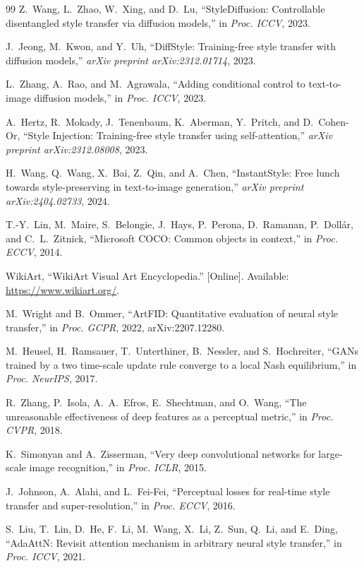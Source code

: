 \documentclass[10pt,twocolumn]{article}
\begin{document}
\begin{thebibliography}{99}
 Z.~Wang, L.~Zhao, W.~Xing, and D.~Lu, ``StyleDiffusion: Controllable disentangled style transfer via diffusion models,'' in \emph{Proc. ICCV}, 2023.

 J.~Jeong, M.~Kwon, and Y.~Uh, ``DiffStyle: Training-free style transfer with diffusion models,'' \emph{arXiv preprint arXiv:2312.01714}, 2023.

 L.~Zhang, A.~Rao, and M.~Agrawala, ``Adding conditional control to text-to-image diffusion models,'' in \emph{Proc. ICCV}, 2023.

 A.~Hertz, R.~Mokady, J.~Tenenbaum, K.~Aberman, Y.~Pritch, and D.~Cohen-Or, ``Style Injection: Training-free style transfer using self-attention,'' \emph{arXiv preprint arXiv:2312.08008}, 2023.

 H.~Wang, Q.~Wang, X.~Bai, Z.~Qin, and A.~Chen, ``InstantStyle: Free lunch towards style-preserving in text-to-image generation,'' \emph{arXiv preprint arXiv:2404.02733}, 2024.

 T.-Y.~Lin, M.~Maire, S.~Belongie, J.~Hays, P.~Perona, D.~Ramanan, P.~Doll\'{a}r, and C.~L.~Zitnick, ``Microsoft COCO: Common objects in context,'' in \emph{Proc. ECCV}, 2014.

 WikiArt, ``WikiArt Visual Art Encyclopedia.'' [Online]. Available: \url{https://www.wikiart.org/}.

 M.~Wright and B.~Ommer, ``ArtFID: Quantitative evaluation of neural style transfer,'' in \emph{Proc. GCPR}, 2022, arXiv:2207.12280.

 M.~Heusel, H.~Ramsauer, T.~Unterthiner, B.~Nessler, and S.~Hochreiter, ``GANs trained by a two time-scale update rule converge to a local Nash equilibrium,'' in \emph{Proc. NeurIPS}, 2017.

 R.~Zhang, P.~Isola, A.~A.~Efros, E.~Shechtman, and O.~Wang, ``The unreasonable effectiveness of deep features as a perceptual metric,'' in \emph{Proc. CVPR}, 2018.

 K.~Simonyan and A.~Zisserman, ``Very deep convolutional networks for large-scale image recognition,'' in \emph{Proc. ICLR}, 2015.

 J.~Johnson, A.~Alahi, and L.~Fei-Fei, ``Perceptual losses for real-time style transfer and super-resolution,'' in \emph{Proc. ECCV}, 2016.

 S.~Liu, T.~Lin, D.~He, F.~Li, M.~Wang, X.~Li, Z.~Sun, Q.~Li, and E.~Ding, ``AdaAttN: Revisit attention mechanism in arbitrary neural style transfer,'' in \emph{Proc. ICCV}, 2021.


\end{thebibliography}
\end{document}
